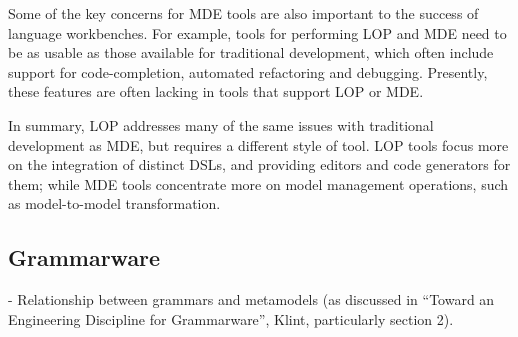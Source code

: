 Some of the key concerns for MDE tools are also important to the success of language workbenches. For example, tools for performing LOP and MDE need to be as usable as those available for traditional development, which often include support for code-completion, automated refactoring and debugging. Presently, these features are often lacking in tools that support LOP or MDE.

In summary, LOP addresses many of the same issues with traditional development as MDE, but requires a different style of tool. LOP tools focus more on the integration of distinct DSLs, and providing editors and code generators for them; while MDE tools concentrate more on model management operations, such as model-to-model transformation.

\subsection{Grammarware}
\label{subsec:grammarware}
- Relationship between grammars and metamodels (as discussed in ``Toward an Engineering Discipline for Grammarware'', Klint, particularly section 2).
